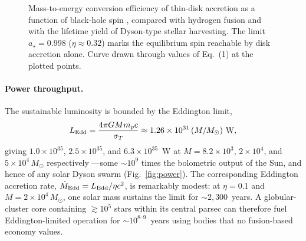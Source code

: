 \documentclass[11pt]{article}
\newcommand{\msun}{M_\odot}
\newcommand{\astar}{a_\star}
\begin{document}
\begin{figure}[t]
\centering
{}
\caption{Mass-to-energy conversion efficiency of thin-disk accretion as a function of black-hole spin \citep{bardeen1972,novikov1973}, compared with hydrogen fusion and with the lifetime yield of Dyson-type stellar harvesting. The \citet{thorne1974} limit $\astar = 0.998$ ($\eta \approx 0.32$) marks the equilibrium spin reachable by disk accretion alone. Curve drawn through values of Eq.~(1) at the plotted points.}
\label{fig:eff}
\end{figure}

\paragraph{Power throughput.} The sustainable luminosity is bounded by the Eddington limit,
\begin{equation}
L_{\rm Edd} = \frac{4\pi G M m_p c}{\sigma_T} \approx 1.26\times10^{31}\,(M/\msun)\ \mathrm{W},
\end{equation}
giving $1.0\times10^{35}$, $2.5\times10^{35}$, and $6.3\times10^{35}$~W at $M = 8.2\times10^{3}$, $2\times10^{4}$, and $5\times10^{4}\,\msun$ respectively \citep{frank2002,shapiro1983}---some ${\sim}10^{9}$ times the bolometric output of the Sun, and hence of any solar Dyson swarm (Fig.~\ref{fig:power}). The corresponding Eddington accretion rate, $\dot{M}_{\rm Edd} = L_{\rm Edd}/\eta c^{2}$, is remarkably modest: at $\eta = 0.1$ and $M = 2\times10^{4}\,\msun$, one solar mass sustains the limit for ${\sim}2{,}300$~years. A globular-cluster core containing $\gtrsim 10^{5}$ stars within its central parsec can therefore fuel Eddington-limited operation for ${\sim}10^{8\text{--}9}$~years using bodies that no fusion-based economy values.
\end{document}
